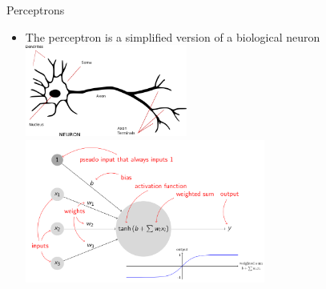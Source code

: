 \documentclass[xcolor=pdftex,x11names,table,hyperref]{beamer}
\begin{document}
\begin{frame}{Perceptrons}
\begin{itemize}
	\item The perceptron is a simplified version of a biological neuron
		\hspace*{-3.0em}%
		\includegraphics[width=0.42\textwidth]{images/Neuron_-_annotated.png}%
		\includegraphics[width=0.62\textwidth]{images/kata_perceptron.png}
%
%
%
%
%
%
%
%
%
%
%
%


\end{itemize}
\end{frame}
\end{document}
